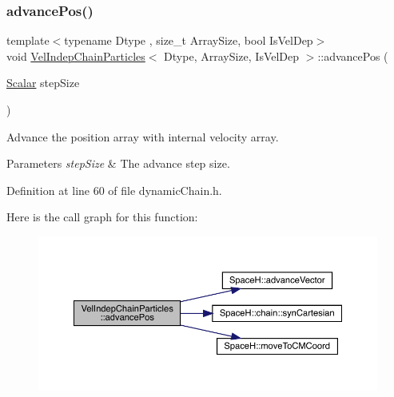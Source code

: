 \subsubsection{\texorpdfstring{advance\+Pos()}{advancePos()}}
{\footnotesize\ttfamily template$<$typename Dtype , size\+\_\+t Array\+Size, bool Is\+Vel\+Dep$>$ \\
void \mbox{\hyperlink{class_vel_indep_chain_particles}{Vel\+Indep\+Chain\+Particles}}$<$ Dtype, Array\+Size, Is\+Vel\+Dep $>$\+::advance\+Pos (\begin{DoxyParamCaption}\item[{\mbox{\hyperlink{class_vel_indep_particles_a5d275b22f0d759f360ddd80e78f4b466}{Scalar}}}]{step\+Size }\end{DoxyParamCaption})\hspace{0.3cm}{\ttfamily [inline]}}



Advance the position array with internal velocity array. 


\begin{DoxyParams}{Parameters}
{\em step\+Size} & The advance step size. \\
\hline
\end{DoxyParams}


Definition at line 60 of file dynamic\+Chain.\+h.

Here is the call graph for this function\+:\nopagebreak
\begin{figure}[H]
\begin{center}
\leavevmode
\includegraphics[width=350pt]{class_vel_indep_chain_particles_a76124f26a1e37892cd38f533edcbb8e8_cgraph}
\end{center}
\end{figure}
\mbox{\label{class_vel_indep_chain_particles_aa09b6bf7f9efbe1da4de3d106581b3a6}} 
